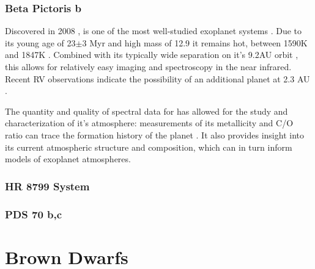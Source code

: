 \autocite{Beichman2019} %
\autocite{Lagage2015} %
\autocite{Macintosh2006} %
\autocite{Macintosh2015} %
\subsubsection{Beta Pictoris b}
Discovered in 2008 \autocite{Lagrange2009}, \bpic is one of the most well-studied exoplanet systems \autocite{Quanz2010,Chilcote2015,Chilcote2017,Hoeihmakers2018}. 
Due to its young age of 23$\pm3$ Myr \autocite{Mamajek2014} and high mass of 12.9 \mj \autocite{Chilcote2015} it remains hot, between 1590K and 1847K \autocite{Nowak2019}. 
Combined with its typically wide separation on it's 9.2AU orbit \autocite{Chauvin2012}, this allows for relatively easy imaging and spectroscopy in the near infrared. 
Recent RV observations indicate the possibility of an additional planet at 2.3 AU \autocite{Lagrange2019}.

The quantity and quality of spectral data for \bpic has allowed for the study and characterization of it's atmosphere: measurements of its metallicity and C/O ratio can trace the formation history of the planet \autocite{Chilcote2017,Nowak2019}.
It also provides insight into its current atmospheric structure and composition, which can in turn inform models of exoplanet atmospheres.
\subsubsection{HR 8799 System}
\subsubsection{PDS 70 b,c}
\section{Brown Dwarfs}
\autocite{Oliveira} %
\autocite{Helling2014}%
\autocite{Cooper2014} %
\autocite{Madhusudhan2018a} %
\autocite{Burrows2003} %
\autocite{Marley2014} %
\autocite{Manjavacas2014} %
\autocite{Biller2017} %
\autocite{Faherty2018} %
\autocite{Morley2014} %
